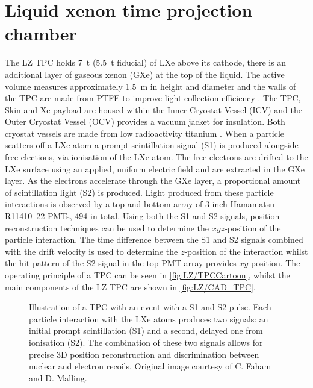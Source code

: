 \section{Liquid xenon time projection chamber}\label{sec:LZ/LXeTPC}
The LZ TPC holds 7~t (5.5~t fiducial) of LXe above its cathode, there is an additional layer of gaseous xenon (GXe) at the top of the liquid. The active volume measures approximately 1.5~m in height and diameter and the walls of the TPC are made from PTFE to improve light collection efficiency \cite{LZNIMA}. The TPC, Skin and Xe payload are housed within the Inner Cryostat Vessel (ICV) and the Outer Cryostat Vessel (OCV) provides a vacuum jacket for insulation. Both cryostat vessels are made from low radioactivity titanium \cite{LZ:2017iwn}. When a particle scatters off a LXe atom a prompt scintillation signal (S1) is produced alongside free elections, via ionisation of the LXe atom. The free electrons are drifted to the LXe surface using an applied, uniform electric field and are extracted in the GXe layer. As the electrons accelerate through the GXe layer, a proportional amount of scintillation light (S2) is produced. Light produced from these particle interactions is observed by a top and bottom array of 3-inch Hamamatsu R11410–22 PMTs, 494 in total. Using both the S1 and S2 signals, position reconstruction techniques can be used to determine the $xyz$-position of the particle interaction. The time difference between the S1 and S2 signals combined with the drift velocity is used to determine the $z$-position of the interaction whilst the hit pattern of the S2 signal in the top PMT array provides $xy$-position. The operating principle of a TPC can be seen in \autoref{fig:LZ/TPCCartoon}, whilst the main components of the LZ TPC are shown in \autoref{fig:LZ/CAD_TPC}.
\begin{figure}[!ht]
    \centering
    
    \caption[Illustration of a TPC with an event with a S1 and S2 pulse.]{Illustration of a TPC with an event with a S1 and S2 pulse. Each particle interaction with the LXe atoms produces two signals: an initial prompt scintillation (S1) and a second, delayed one from ionisation (S2). The combination of these two signals allows for precise 3D position reconstruction and discrimination between nuclear and electron recoils. Original image courtesy of C. Faham and D. Malling.}
    \label{fig:LZ/TPCCartoon}
\end{figure}

